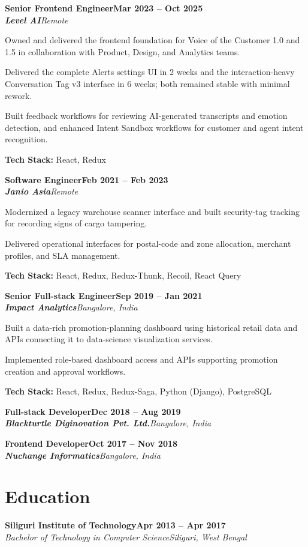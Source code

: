 \documentclass[10pt, letterpaper]{article}
\newcommand{\heading}[2]{
  \hspace{10pt}#1\hfill#2\\
}
\newcommand{\headingBf}[2]{
  \heading{\textbf{#1}}{\textbf{#2}}
}
\newcommand{\headingIt}[2]{
  \heading{\textit{#1}}{\textit{#2}}
}
\newenvironment{resume_list}{
  \vspace{-1pt}
  \begin{itemize}[itemsep=1px, parsep=1pt, leftmargin=30pt]
}{
  \end{itemize}
}
\newcommand{\note}[1]{
  \item[] \textbf{#1}\vspace{4pt}
}
\begin{document}
  \headingBf{Senior Frontend Engineer}{Mar 2023 -- Oct 2025}
  \headingIt{\textbf{Level AI}}{Remote}
  \vspace{1pt}
  \begin{resume_list}
    \item Owned and delivered the frontend foundation for Voice of the Customer 1.0 and 1.5 in collaboration with Product, Design, and Analytics teams.
    \item Delivered the complete Alerts settings UI in 2 weeks and the interaction-heavy Conversation Tag v3 interface in 6 weeks; both remained stable with minimal rework.
    \item Built feedback workflows for reviewing AI-generated transcripts and emotion detection, and enhanced Intent Sandbox workflows for customer and agent intent recognition.
    \note{Tech Stack:} React, Redux
  \end{resume_list}

  \headingBf{Software Engineer}{Feb 2021 -- Feb 2023}
  \headingIt{\textbf{Janio Asia}}{Remote}
  \vspace{1pt}
  \begin{resume_list}
    \item Modernized a legacy warehouse scanner interface and built security-tag tracking for recording signs of cargo tampering.
    \item Delivered operational interfaces for postal-code and zone allocation, merchant profiles, and SLA management.
    \note{Tech Stack:} React, Redux, Redux-Thunk, Recoil, React Query
  \end{resume_list}

  \headingBf{Senior Full-stack Engineer}{Sep 2019 -- Jan 2021}
  \headingIt{\textbf{Impact Analytics}}{Bangalore, India}
  \vspace{1pt}
  \begin{resume_list}
    \item Built a data-rich promotion-planning dashboard using historical retail data and APIs connecting it to data-science visualization services.
    \item Implemented role-based dashboard access and APIs supporting promotion creation and approval workflows.
    \note{Tech Stack:} React, Redux, Redux-Saga, Python (Django), PostgreSQL
  \end{resume_list}

  \headingBf{Full-stack Developer}{Dec 2018 -- Aug 2019}
  \headingIt{\textbf{Blackturtle Diginovation Pvt. Ltd.}}{Bangalore, India}
  \vspace{8pt}

  \headingBf{Frontend Developer}{Oct 2017 -- Nov 2018}
  \headingIt{\textbf{Nuchange Informatics}}{Bangalore, India}

  \section{Education}

  \headingBf{Siliguri Institute of Technology}{Apr 2013 -- Apr 2017}
  \headingIt{Bachelor of Technology in Computer Science}{Siliguri, West Bengal}
\end{document}
